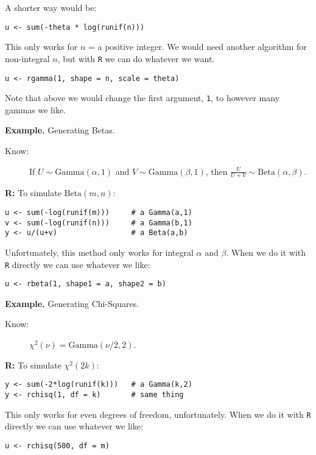 \documentclass[captions=tableheading]{scrbook}
\begin{document}
\begin{itemize}
A shorter way would be:
\begin{verbatim}
u <- sum(-theta * log(runif(n)))
\end{verbatim}

This only works for $n$ = a positive integer. We would need another algorithm for non-integral $n$, but with \texttt{R} we can do whatever we want.
\begin{verbatim}
u <- rgamma(1, shape = n, scale = theta)
\end{verbatim}

Note that above we would change the first argument, \texttt{1}, to however many gammas we like.


\textbf{Example.} Generating Betas.


\begin{description}
\item[Know:] If \( U\sim\mathrm{Gamma}(\alpha,1)\) and \(V\sim\mathrm{Gamma}(\beta,1)\), then \(\frac{U}{U+V}\sim\mathrm{Beta}(\alpha,\beta)\).
\end{description}

\textbf{R:} To simulate $\mathrm{Beta}(m,n)$:
\begin{verbatim}
u <- sum(-log(runif(m)))     # a Gamma(a,1)
v <- sum(-log(runif(n)))     # a Gamma(b,1)
y <- u/(u+v)                 # a Beta(a,b)
\end{verbatim}

Unfortunately, this method only works for integral $\alpha$ and $\beta$.  When we do it with \texttt{R} directly we can use whatever we like:
\begin{verbatim}
u <- rbeta(1, shape1 = a, shape2 = b)
\end{verbatim}


\textbf{Example.} Generating Chi-Squares.


\begin{description}
\item[Know:] $\chi^{2}(\nu)=\mathrm{Gamma}(\nu/2,2)$.
\end{description}

\textbf{R:} To simulate $\chi^{2}(2k)$:
\begin{verbatim}
y <- sum(-2*log(runif(k)))   # a Gamma(k,2)
y <- rchisq(1, df = k)       # same thing
\end{verbatim}

This only works for even degrees of freedom, unfortunately. When we do it with \texttt{R} directly we can use whatever we like:
\begin{verbatim}
u <- rchisq(500, df = m)
\end{verbatim}



\end{itemize}
\end{document}
